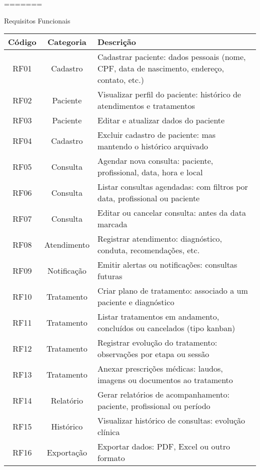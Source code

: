 =======
\begin{quadro}
    \caption{\label{quadro_requisitos_f}Requisitos Funcionais}
    \begin{tabular}{|c|c|p{10cm}|}
        \hline
        \textbf{Código} & \textbf{Categoria} & \textbf{Descrição} \\ \hline
        RF01   & Cadastro     & Cadastrar paciente: dados pessoais (nome, CPF, data de nascimento, endereço, contato, etc.) \\ \hline
        RF02   & Paciente     & Visualizar perfil do paciente: histórico de atendimentos e tratamentos \\ \hline
        RF03   & Paciente     & Editar e atualizar dados do paciente \\ \hline
        RF04   & Cadastro     & Excluir cadastro de paciente: mas mantendo o histórico arquivado \\ \hline
        RF05   & Consulta     & Agendar nova consulta: paciente, profissional, data, hora e local \\ \hline
        RF06   & Consulta     & Listar consultas agendadas: com filtros por data, profissional ou paciente \\ \hline
        RF07   & Consulta     & Editar ou cancelar consulta: antes da data marcada \\ \hline
        RF08   & Atendimento  & Registrar atendimento: diagnóstico, conduta, recomendações, etc. \\ \hline
        RF09   & Notificação  & Emitir alertas ou notificações: consultas futuras \\ \hline
        RF10   & Tratamento   & Criar plano de tratamento: associado a um paciente e diagnóstico \\ \hline
        RF11   & Tratamento   & Listar tratamentos em andamento, concluídos ou cancelados (tipo kanban) \\ \hline
        RF12   & Tratamento   & Registrar evolução do tratamento: observações por etapa ou sessão \\ \hline
        RF13   & Tratamento   & Anexar prescrições médicas: laudos, imagens ou documentos ao tratamento \\ \hline
        RF14   & Relatório    & Gerar relatórios de acompanhamento: paciente, profissional ou período \\ \hline
        RF15   & Histórico    & Visualizar histórico de consultas: evolução clínica \\ \hline
        RF16   & Exportação   & Exportar dados: PDF, Excel ou outro formato \\ \hline

\end{tabular}
\end{quadro}
